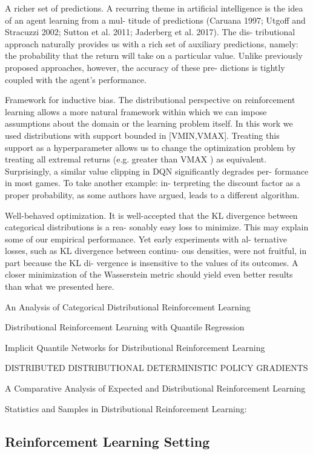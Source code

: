 \documentclass[12pt,a4paper,openright,twoside]{article}
\numberwithin{equation}{section}
\theoremstyle{definition}
\theoremstyle{remark}
\theoremstyle{plain}
\begin{document}
A richer set of predictions. A recurring theme in artificial intelligence is the idea of an agent learning from a mul- titude of predictions (Caruana 1997; Utgoff and Stracuzzi 2002; Sutton et al. 2011; Jaderberg et al. 2017). The dis- tributional approach naturally provides us with a rich set of auxiliary predictions, namely: the probability that the return will take on a particular value. Unlike previously proposed approaches, however, the accuracy of these pre- dictions is tightly coupled with the agent’s performance.

Framework for inductive bias. The distributional perspective on reinforcement learning allows a more natural framework within which we can impose assumptions about the domain or the learning problem itself. In this work we used distributions with support bounded in [VMIN,VMAX]. Treating this support as a hyperparameter allows us to change the optimization problem by treating all extremal returns (e.g. greater than VMAX ) as equivalent. Surprisingly, a similar value clipping in DQN significantly degrades per- formance in most games. To take another example: in- terpreting the discount factor as a proper probability, as some authors have argued, leads to a different algorithm.


Well-behaved optimization. It is well-accepted that the KL divergence between categorical distributions is a rea- sonably easy loss to minimize. This may explain some of our empirical performance. Yet early experiments with al- ternative losses, such as KL divergence between continu- ous densities, were not fruitful, in part because the KL di- vergence is insensitive to the values of its outcomes. A closer minimization of the Wasserstein metric should yield even better results than what we presented here.

An Analysis of Categorical Distributional Reinforcement Learning

Distributional Reinforcement Learning with Quantile Regression

Implicit Quantile Networks for Distributional Reinforcement Learning

DISTRIBUTED DISTRIBUTIONAL DETERMINISTIC POLICY GRADIENTS

A Comparative Analysis of Expected and Distributional Reinforcement Learning

Statistics and Samples in Distributional Reinforcement Learning:




\subsection{Reinforcement Learning Setting}
\end{document}
